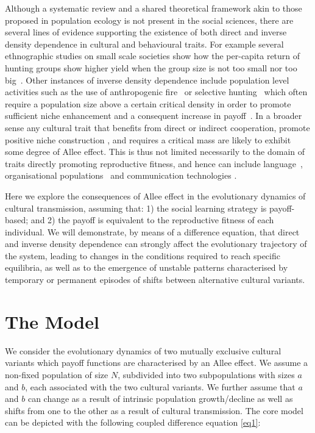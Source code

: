\documentclass[3p,authoryear,twocolumn]{elsarticle} %
\begin{document}
Although a systematic review and a shared theoretical framework akin to those proposed in population ecology \citep{kramer_etal_2009} is not present in the social sciences, there are several lines of evidence supporting the existence of both direct and inverse density dependence in cultural and behavioural traits. For example several ethnographic studies on small scale societies show how the per-capita return of hunting groups show higher yield when the group size is not too small nor too big~\citep{hill_and_hawkes_1983,janssen_and_hill_2014}. Other instances of inverse density dependence include population level activities such as the use of anthropogenic fire~\citep{bird2013} or selective hunting~\citep{dods_2002} which often require a population size above a certain critical density in order to promote sufficient niche enhancement and a consequent increase in payoff~\citep{rowley-conwy_and_layton_2011}. In a broader sense any cultural trait that benefits from direct or indirect cooperation, 
promote positive niche construction \citep{vandermeer_2008}, and requires a critical mass \citep{rogers_2003} are likely to exhibit some degree of Allee effect. This is thus not limited necessarily to the domain of traits directly promoting reproductive fitness, and hence can include language~\citep{kandler2009}, organisational populations~\citep{caroll_and_hannan_1989} and communication technologies \citep{van_slyke_perceived_2007}.

Here we explore the consequences of Allee effect in the evolutionary dynamics of cultural transmission, assuming that: 1) the social learning strategy is payoff-based; and 2)  the payoff is equivalent to the reproductive fitness of each individual. We will demonstrate, by means of a difference equation, that direct and inverse density dependence can strongly affect the evolutionary trajectory of the system, leading to changes in the conditions required to reach specific equilibria, as well as to the emergence of unstable patterns characterised by temporary or permanent episodes of shifts between alternative cultural variants.

\section{The Model}
We consider the evolutionary dynamics of two mutually exclusive cultural variants which payoff functions are characterised by an Allee effect. We assume a non-fixed population of size $N$, subdivided into two subpopulations with sizes $a$ and $b$, each associated with the two cultural variants. We further assume that $a$ and $b$ can change as a result of intrinsic population growth/decline as well as shifts from one to the other as a result of cultural transmission. The core model can be depicted with the following coupled difference equation \eqref{eq1}:
\end{document}
